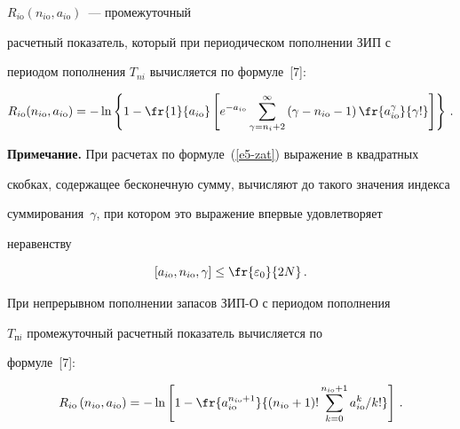 $R_{i\mathrm{o}}(n_{i\mathrm{o}}, a_{i\mathrm{o}})$~--- промежуточный

расчетный показатель, который при периодическом пополнении ЗИП с

периодом пополнения $T_{ni}$ вычисляется по формуле~[7]:

\begin{equation}

R_{i\mathrm{o}}(n_{i\mathrm{o}}, a_{i\mathrm{o}}) =-\ln \left\{ 1-\fr{1}

{a_{i\mathrm{o}}}\left[ e^{-a_{i\mathrm{o}}}

\sum\limits^\infty_{\gamma=n_i+2} \left( \gamma -n_{i\mathrm{o}} -1\right)

\fr{a^\gamma_{i\mathrm{o}}}{\gamma!} \right] \right\}\,.

\label{e5-zat}

\end{equation}



\noindent

{\small {\textbf{Примечание.}} При расчетах по формуле~(\ref{e5-zat}) выражение в квадратных

скобках, содержащее бесконечную сумму, вычисляют до такого значения индекса

суммирования~$\gamma$, при котором это выражение впервые удовлетворяет

неравенству

\begin{equation}

\left[ a_{i\mathrm{o}}, n_{i\mathrm{o}},\gamma \right] \leq \fr{\varepsilon_0}{2N}\,.

\label{e6-zat}

\end{equation}}



      \smallskip



     При непрерывном пополнении запасов ЗИП-О с периодом пополнения

$T_{\mathrm{п}i}$ промежуточный расчетный показатель вычисляется по

формуле~[7]:

     \begin{equation}

     R_{i\mathrm{o}}\left( n_{i\mathrm{o}}, a_{i\mathrm{o}}\right) =-\ln

\left[ 1- \fr{a_{i\mathrm{o}}^{n_{i\mathrm{o}}+1}} {(n_{i\mathrm{o}}+1)!

\sum\limits_{k=0}^{n_{i\mathrm{o}}+1} a_{i\mathrm{o}}^k/k!}\right]\,.

     \label{e7-zat}

     \end{equation}



